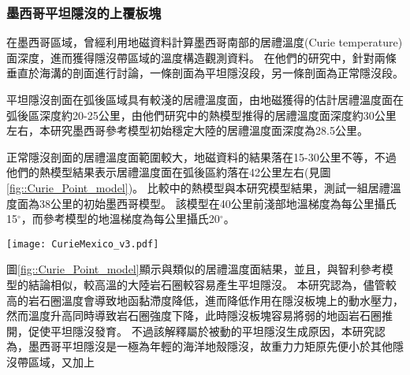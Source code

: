 
\subsubsection{墨西哥平坦隱沒的上覆板塊}
在墨西哥區域，\citealp{Manea2011Curie}曾經利用地磁資料計算墨西哥南部的居禮溫度(Curie temperature)面深度，進而獲得隱沒帶區域的溫度構造觀測資料。
在他們的研究中，針對兩條垂直於海溝的剖面進行討論，一條剖面為平坦隱沒段，另一條剖面為正常隱沒段。

平坦隱沒剖面在弧後區域具有較淺的居禮溫度面，由地磁獲得的估計居禮溫度面在弧後區深度約20-25公里，由他們研究中的熱模型推得的居禮溫度面深度約30公里左右，本研究墨西哥參考模型初始穩定大陸的居禮溫度面深度為28.5公里。

正常隱沒剖面的居禮溫度面範圍較大，地磁資料的結果落在15-30公里不等，不過他們的熱模型結果表示居禮溫度面在弧後區約落在42公里左右(見圖\ref{fig::Curie_Point_model})。
比較\citealp{Manea2011Curie}中的熱模型與本研究模型結果，測試一組居禮溫度面為38公里的初始墨西哥模型。
該模型在40公里前淺部地溫梯度為每公里攝氏15$^\circ$，而參考模型的地溫梯度為每公里攝氏20$^\circ$。

\begin{figure*}[ht!]
    \centering
    \texttt{[image: CurieMexico\_v3.pdf]}
    \caption[墨西哥兩條剖面的居禮溫度面與熱構造模型與不同地溫梯度的墨西哥模型在30 Myr的隱沒板塊構造與580$^\circ$等溫線]{(a)(b)(d)(e)墨西哥兩條剖面的居禮溫度面與熱構造模型，摘自\citealp{Manea2011Curie}。(c)(f)不同地溫梯度的墨西哥模型在30 Myr的隱沒板塊構造(黑線)於100公里以上之剖面與580$^\circ$等溫線(橘線)，幾何形狀取自隱沒板塊頂部，使用5公里移動平均平滑離散化的網格。(a)繪出平坦隱沒區域的居禮溫度面(紅線，虛線為外差值)、隱沒板塊頂部(黑線)與\citealp{Manea2011Curie}中熱模型攝氏580$^\circ$等溫線。(b)\citealp{Manea2011Curie}的平坦隱沒熱模型。(c)墨西哥參考模型在30 Myr的隱沒板塊構造(黑線)於100公里以上之剖面與580$^\circ$等溫線(橘線)。(d)繪出正常隱沒區域的居禮溫度面(藍線)、隱沒板塊頂部(黑線)與\citealp{Manea2011Curie}中熱模型攝氏580$^\circ$等溫線。(e)\citealp{Manea2011Curie}的正常隱沒熱模型。(f)測試一組於地表至40公里中每公里攝氏15$^\circ$的模型。模型於30 Myr的隱沒板塊構造(黑線)於100公里以上之剖面與580$^\circ$等溫線(橘線)。
    }
    \label{fig::Curie_Point_model}
\end{figure*}

圖\ref{fig::Curie_Point_model}顯示與\citealp{Manea2011Curie}類似的居禮溫度面結果，並且，與智利參考模型的結論相似，較高溫的大陸岩石圈較容易產生平坦隱沒。
本研究認為，儘管較高的岩石圈溫度會導致地函黏滯度降低，進而降低作用在隱沒板塊上的動水壓力，然而溫度升高同時導致岩石圈強度下降，此時隱沒板塊容易將弱的地函岩石圈推開，促使平坦隱沒發育。
不過該解釋屬於被動的平坦隱沒生成原因，本研究認為，墨西哥平坦隱沒是一極為年輕的海洋地殼隱沒，故重力力矩原先便小於其他隱沒帶區域，又加上

